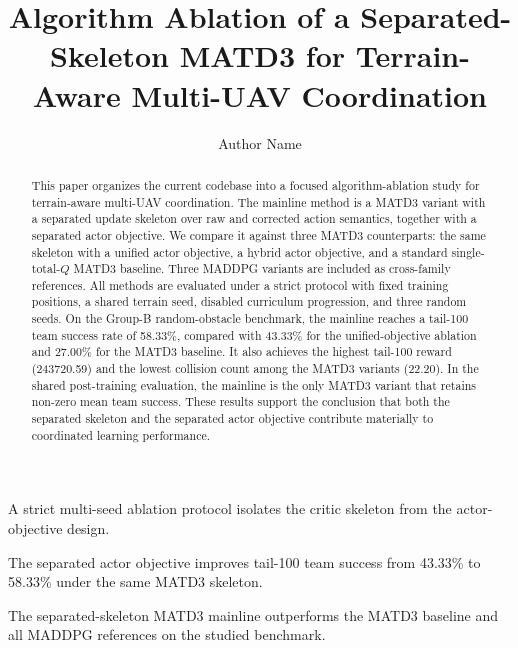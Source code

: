 \documentclass[a4paper,fleqn]{cas-dc}
\begin{document}
\let\WriteBookmarks\relax
\def\floatpagepagefraction{1}
\def\textpagefraction{.001}


\title[mode=title]{Algorithm Ablation of a Separated-Skeleton MATD3 for Terrain-Aware Multi-UAV Coordination}

\author[1]{Author Name}
\cormark[1]



\newcommand{\ablationplotdir}{../matd3/ablation_experiments/multi_seed_groupB_20260331_220752/plots}

\begin{abstract}
This paper organizes the current codebase into a focused algorithm-ablation study for terrain-aware multi-UAV coordination. The mainline method is a MATD3 variant with a separated update skeleton over raw and corrected action semantics, together with a separated actor objective. We compare it against three MATD3 counterparts: the same skeleton with a unified actor objective, a hybrid actor objective, and a standard single-total-$Q$ MATD3 baseline. Three MADDPG variants are included as cross-family references. All methods are evaluated under a strict protocol with fixed training positions, a shared terrain seed, disabled curriculum progression, and three random seeds. On the Group-B random-obstacle benchmark, the mainline reaches a tail-100 team success rate of 58.33\%, compared with 43.33\% for the unified-objective ablation and 27.00\% for the MATD3 baseline. It also achieves the highest tail-100 reward (243720.59) and the lowest collision count among the MATD3 variants (22.20). In the shared post-training evaluation, the mainline is the only MATD3 variant that retains non-zero mean team success. These results support the conclusion that both the separated skeleton and the separated actor objective contribute materially to coordinated learning performance.
\end{abstract}

\begin{highlights}
\item A strict multi-seed ablation protocol isolates the critic skeleton from the actor-objective design.
\item The separated actor objective improves tail-100 team success from 43.33\% to 58.33\% under the same MATD3 skeleton.
\item The separated-skeleton MATD3 mainline outperforms the MATD3 baseline and all MADDPG references on the studied benchmark.
\end{highlights}
\end{document}
